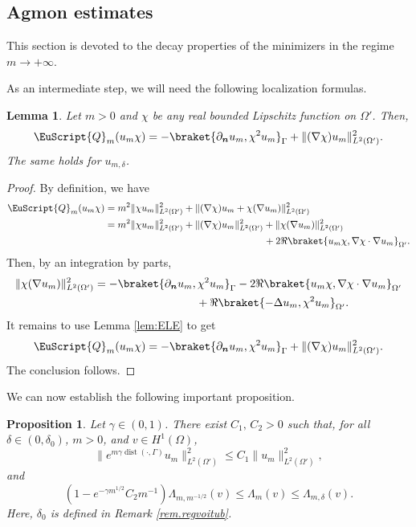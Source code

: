 \documentclass[10pt]{amsart}
\let\mathcal \EuScript
\newcommand{\cQ}{\mathcal{Q}}
\DeclareMathOperator{\dist}{dist}
\theoremstyle{plain}
\newtheorem{lemma}[theorem]{Lemma}
\newtheorem{proposition}[theorem]{Proposition}
\theoremstyle{definition}
\newcommand{\bn}{{\boldsymbol n}}
\let\pa\partial
\begin{document}
\subsection{Agmon estimates}\label{sec.Agmon}
This section is devoted to the decay properties of the minimizers in the regime $m\to+\infty$.

As an intermediate step, we will need the following localization formulas.

\begin{lemma}\label{lem.IMS}
Let $m>0$ and $\chi$ be any real bounded Lipschitz function on $\Omega'$.
Then,
\begin{equation}\label{eq:idfq1}
\cQ_m(u_m\chi) = -\braket{\pa_\bn u_m,\chi^2u_m}_{\Gamma} + \|(\nabla\chi) u_m \|^2_{L^2(\Omega')}.
\end{equation}
The same holds for $u_{m,\delta}$.
\end{lemma}

\begin{proof}
By definition, we have
\[\begin{split}
\cQ_m(u_m\chi)
&=
m^2\|\chi u_m\|^2_{L^2(\Omega')} + \|(\nabla\chi) u_m + \chi(\nabla u_m)\|^2_{L^2(\Omega')}
\\
&
=
m^2\|\chi u_m\|^2_{L^2(\Omega')}
+ \|(\nabla\chi) u_m \|^2_{L^2(\Omega')} + \| \chi(\nabla u_m)\|^2_{L^2(\Omega')}\\
&\hspace*{5.75cm}+ 2\Re\braket{u_m\chi, \nabla\chi\cdot \nabla u_m}_{\Omega'}.
\end{split}\]
Then, by an integration by parts,
\[\begin{split}
\| \chi(\nabla u_m)\|^2_{L^2(\Omega')} &= -\braket{\pa_\bn u_m,\chi^2u_m}_{\Gamma} -2\Re\braket{u_m\chi, \nabla\chi\cdot \nabla u_m}_{\Omega'}\\
&\hspace*{3.2cm}+ \Re\braket{-\Delta u_m,\chi^2 u_m}_{\Omega'}.
\end{split}\]
It remains to use Lemma \ref{lem:ELE} to get
\[
\cQ_m(u_m\chi) = -\braket{\pa_\bn u_m,\chi^2u_m}_{\Gamma} + \|(\nabla\chi) u_m \|^2_{L^2(\Omega')}.
\]
The conclusion follows.
\end{proof}

We can now establish the following important proposition.
\begin{proposition}\label{lem:agmon1}
Let $\gamma\!\in\!(0,1)$.
There exist $C_1,\,C_2\!>\!0$ such that, for all $\delta\!\in\!(0,\delta_0)$, $m>0$, and $v\in H^1(\Omega)$,
\begin{equation}\label{eq.agmon1a}
\|e^{m\gamma\dist(\cdot, \Gamma)}u_m\|^2_{L^2(\Omega')}\leq C_1 \|u_m\|^2_{L^2(\Omega')},
\end{equation}
and
\begin{equation}\label{eq.agmon1b}
(1 - e^{-\gamma m^{1/2}}C_2m^{-1})\Lambda_{m,m^{-1/2}}(v)\leq\Lambda_{m}(v)\leq\Lambda_{m,\delta}(v).
\end{equation}
Here, $\delta_0$ is defined in Remark \ref{rem.regvoitub}.
\end{proposition}
\end{document}
